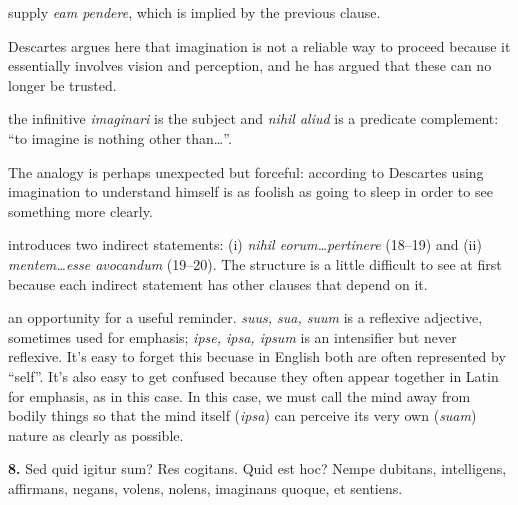  supply \textit{eam pendere}, which is implied by the previous clause.

 Descartes argues here that imagination is not a reliable way to proceed because it essentially involves vision and perception, and he has argued that these can no longer be trusted.

 the infinitive \textit{imaginari} is the subject and \textit{nihil aliud} is a predicate complement: ``to imagine is nothing other than\dots''.

 The analogy is perhaps unexpected but forceful: according to Descartes using imagination to understand himself is as foolish as going to sleep in order to see something more clearly.

 introduces two indirect statements: (i) \textit{nihil eorum\dots pertinere} (18--19) and (ii) \textit{mentem\dots esse avocandum} (19--20). The structure is a little difficult to see at first because each indirect statement has other clauses that depend on it.

 an opportunity for a useful reminder. \textit{suus, sua, suum} is a reflexive adjective, sometimes used for emphasis; \textit{ipse, ipsa, ipsum} is an intensifier but never reflexive. It's easy to forget this becuase in English both are often represented by ``self''. It's also easy to get confused because they often appear together in Latin for emphasis, as in this case. In this case, we must call the mind away from bodily things so that the mind itself (\textit{ipsa}) can perceive its very own (\textit{suam}) nature as clearly as possible.

\clearpage

\beginnumbering
\pstart
\begin{latin}
    \textenglish{\textbf{8.}} Sed quid igitur sum? Res cogitans. Quid est hoc? Nempe dubitans, intelligens, affirmans, negans, volens, nolens, imaginans quoque, et sentiens.
\end{latin}
\pend
\endnumbering

